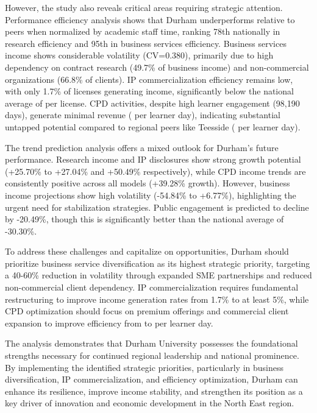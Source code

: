 \documentclass[journal,onecolumn, 10pt,draftclsnofoot]{IEEEtran}
\begin{document}
However, the study also reveals critical areas requiring strategic attention. Performance efficiency analysis shows that Durham underperforms relative to peers when normalized by academic staff time, ranking 78th nationally in research efficiency and 95th in business services efficiency. Business services income shows considerable volatility (CV=0.380), primarily due to high dependency on contract research (49.7\% of business income) and non-commercial organizations (66.8\% of clients). IP commercialization efficiency remains low, with only 1.7\% of licenses generating income, significantly below the national average of  per license. CPD activities, despite high learner engagement (98,190 days), generate minimal revenue ( per learner day), indicating substantial untapped potential compared to regional peers like Teesside ( per learner day).

The trend prediction analysis offers a mixed outlook for Durham's future performance. Research income and IP disclosures show strong growth potential (+25.70\% to +27.04\% and +50.49\% respectively), while CPD income trends are consistently positive across all models (+39.28\% growth). However, business income projections show high volatility (-54.84\% to +6.77\%), highlighting the urgent need for stabilization strategies. Public engagement is predicted to decline by -20.49\%, though this is significantly better than the national average of -30.30\%.

To address these challenges and capitalize on opportunities, Durham should prioritize business service diversification as its highest strategic priority, targeting a 40-60\% reduction in volatility through expanded SME partnerships and reduced non-commercial client dependency. IP commercialization requires fundamental restructuring to improve income generation rates from 1.7\% to at least 5\%, while CPD optimization should focus on premium offerings and commercial client expansion to improve efficiency from  to  per learner day.

The analysis demonstrates that Durham University possesses the foundational strengths necessary for continued regional leadership and national prominence. By implementing the identified strategic priorities, particularly in business diversification, IP commercialization, and efficiency optimization, Durham can enhance its resilience, improve income stability, and strengthen its position as a key driver of innovation and economic development in the North East region.
\end{document}
